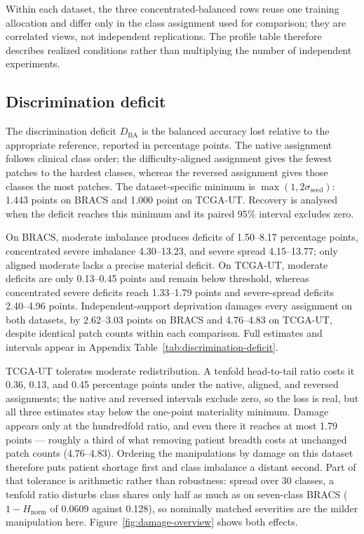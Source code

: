 \documentclass[11pt]{article}
\newcommand{\Hnorm}{1-H_{\mathrm{norm}}}
\begin{document}
Within each dataset, the three concentrated-balanced rows reuse one training allocation and differ only in the class assignment used for comparison; they are correlated views, not independent replications. The profile table therefore describes realized conditions rather than multiplying the number of independent experiments.

\subsection{Discrimination deficit}
\label{sec:rq1-discrimination}
The discrimination deficit $D_{\mathrm{BA}}$ is the balanced accuracy lost relative to the appropriate reference, reported in percentage points. The native assignment follows clinical class order; the difficulty-aligned assignment gives the fewest patches to the hardest classes, whereas the reversed assignment gives those classes the most patches. The dataset-specific minimum is $\max(\num{1},2\sigma_{\mathrm{seed}})$: \num{1.443} points on BRACS and \num{1.000} point on TCGA-UT. Recovery is analysed when the deficit reaches this minimum and its paired \num{95}\% interval excludes zero.

On BRACS, moderate imbalance produces deficits of \num{1.50}--\num{8.17} percentage points, concentrated severe imbalance \num{4.30}--\num{13.23}, and severe spread \num{4.15}--\num{13.77}; only aligned moderate lacks a precise material deficit. On TCGA-UT, moderate deficits are only \num{0.13}--\num{0.45} points and remain below threshold, whereas concentrated severe deficits reach \num{1.33}--\num{1.79} points and severe-spread deficits \num{2.40}--\num{4.96} points. Independent-support deprivation damages every assignment on both datasets, by \num{2.62}--\num{3.03} points on BRACS and \num{4.76}--\num{4.83} on TCGA-UT, despite identical patch counts within each comparison. Full estimates and intervals appear in Appendix Table~\ref{tab:discrimination-deficit}.

TCGA-UT tolerates moderate redistribution. A tenfold head-to-tail ratio costs it \num{0.36}, \num{0.13}, and \num{0.45} percentage points under the native, aligned, and reversed assignments; the native and reversed intervals exclude zero, so the loss is real, but all three estimates stay below the one-point materiality minimum. Damage appears only at the hundredfold ratio, and even there it reaches at most \num{1.79} points --- roughly a third of what removing patient breadth costs at unchanged patch counts (\num{4.76}--\num{4.83}). Ordering the manipulations by damage on this dataset therefore puts patient shortage first and class imbalance a distant second. Part of that tolerance is arithmetic rather than robustness: spread over 30 classes, a tenfold ratio disturbs class shares only half as much as on seven-class BRACS ($\Hnorm$ of \num{0.0609} against \num{0.128}), so nominally matched severities are the milder manipulation here. Figure~\ref{fig:damage-overview} shows both effects.
\end{document}
